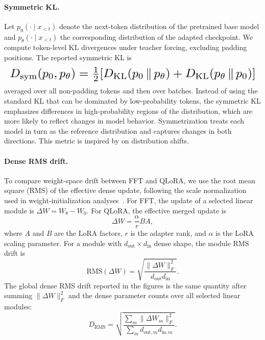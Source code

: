 \documentclass[11pt]{article}
\begin{document}

\paragraph{Symmetric KL.}
Let $p_0(\cdot \mid x_{<t})$ denote the next-token distribution of the
pretrained base model and $p_\theta(\cdot \mid x_{<t})$ the corresponding
distribution of the adapted checkpoint.
We compute
token-level KL divergences under teacher forcing, excluding padding positions.
The reported symmetric KL is
\begin{equation*}
\resizebox{\linewidth}{!}{$
    D_{\mathrm{sym}}(p_0,p_\theta)
    = \tfrac{1}{2}
    \!\left[
    D_{\mathrm{KL}}(p_0 \,\|\, p_\theta) 
    + D_{\mathrm{KL}}(p_\theta \,\|\, p_0)
    \right]
$}
\end{equation*}
averaged over all non-padding tokens and then over batches. 
Instead of using the standard KL that can be dominated by low-probability tokens, 
the symmetric KL emphasizes differences in high-probability regions of the 
distribution, which are more likely to reflect changes in model behavior.
Symmetrization treats
each model in turn as the reference distribution and captures changes in both
directions.
This metric is inspired by \citet{shenfeld2026rls} on distribution shifts. 

\paragraph{Dense RMS drift.}
To compare weight-space drift between FFT and QLoRA, we use the root mean square
(RMS) of the effective dense update, following the scale normalization used in
weight-initialization analyses~\citep{pmlr-v9-glorot10a}. For FFT, the update of a selected
linear module is $\Delta W = W_{\theta} - W_0$. For QLoRA, the effective
merged update is
\[
\Delta W = \frac{\alpha}{r} BA,
\]
where $A$ and $B$ are the LoRA factors, $r$ is the adapter rank, and
$\alpha$ is the LoRA scaling parameter. For a module with $d_{\mathrm{out}}
\times d_{\mathrm{in}}$ dense shape, the module RMS drift is
\[
\mathrm{RMS}(\Delta W)
= \sqrt{
\frac{\|\Delta W\|_F^2}{d_{\mathrm{out}} d_{\mathrm{in}}}
}.
\]
The global dense RMS drift reported in the figures is the same quantity after
summing $\|\Delta W\|_F^2$ and the dense parameter counts over all selected
linear modules:
\[
D_{\mathrm{RMS}}
= \sqrt{
\frac{\sum_m \|\Delta W_m\|_F^2}
{\sum_m d_{\mathrm{out},m} d_{\mathrm{in},m}}
}.
\]
\end{document}
